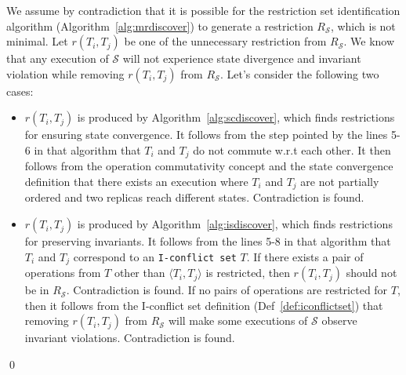  We assume by contradiction that 
it is possible for the restriction set identification algorithm (Algorithm~\ref{alg:mrdiscover})
to generate a restriction $R_{\mathscr{S}}$, which is not minimal. Let $r(T_i, T_j)$ be
one of the unnecessary restriction from $R_{\mathscr{S}}$. We know that any execution of $\mathscr{S}$
will not experience state divergence and invariant violation while removing $r(T_i, T_j)$ from $R_{\mathscr{S}}$.
Let's consider the following two cases:
\begin{itemize}
 \item $r(T_i, T_j)$ is produced by Algorithm~\ref{alg:scdiscover}, which finds restrictions for ensuring state convergence.
It follows from the step pointed by the lines 5-6 in that algorithm that $T_i$ and $T_j$ do not commute w.r.t each other.
It then follows from the operation commutativity concept and the state convergence definition that there exists
an execution where $T_i$ and $T_j$ are not partially ordered and two replicas reach different states. Contradiction is found.
 \item $r(T_i, T_j)$ is produced by Algorithm~\ref{alg:isdiscover}, which finds restrictions for preserving invariants. It follows
from the lines 5-8 in that algorithm that $T_i$ and $T_j$ correspond to an {\tt I-conflict set} $T$. If there exists
a pair of operations from $T$ other than $\langle T_i, T_j \rangle$ is restricted, then $r(T_i, T_j)$ should not be in
$R_{\mathscr{S}}$. Contradiction is found. If no pairs of operations are restricted for $T$, then it follows from 
the I-conflict set definition (Def~\ref{def:iconflictset}) that removing $r(T_i, T_j)$ from $R_{\mathscr{S}}$ will make 
some executions of $\mathscr{S}$ observe invariant violations. Contradiction is found.
\end{itemize}
\qed
